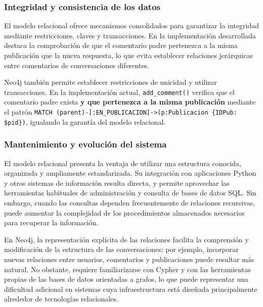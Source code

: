 \documentclass[11pt, a4paper]{article}
\begin{document}
\subsubsection{Integridad y consistencia de los datos}
El modelo relacional ofrece mecanismos consolidados para garantizar la integridad mediante restricciones, claves y transacciones. En la implementación desarrollada destaca la comprobación de que el comentario padre pertenezca a la misma publicación que la nueva respuesta, lo que evita establecer relaciones jerárquicas entre comentarios de conversaciones diferentes.

Neo4j también permite establecer restricciones de unicidad y utilizar transacciones. En la implementación actual, \texttt{add\_comment()} verifica que el comentario padre exista \textbf{y que pertenezca a la misma publicación} mediante el patrón \texttt{MATCH (parent)-[:EN\_PUBLICACION]->(p:Publicacion \{IDPub: \$pid\})}, igualando la garantía del modelo relacional.

\subsubsection{Mantenimiento y evolución del sistema}
El modelo relacional presenta la ventaja de utilizar una estructura conocida, organizada y ampliamente estandarizada. Su integración con aplicaciones Python y otros sistemas de información resulta directa, y permite aprovechar las herramientas habituales de administración y consulta de bases de datos SQL. Sin embargo, cuando las consultas dependen frecuentemente de relaciones recursivas, puede aumentar la complejidad de los procedimientos almacenados necesarios para recuperar la información.

En Neo4j, la representación explícita de las relaciones facilita la comprensión y modificación de la estructura de las conversaciones; por ejemplo, incorporar nuevas relaciones entre usuarios, comentarios y publicaciones puede resultar más natural. No obstante, requiere familiarizarse con Cypher y con las herramientas propias de las bases de datos orientadas a grafos, lo que puede representar una dificultad adicional en sistemas cuya infraestructura está diseñada principalmente alrededor de tecnologías relacionales.
\end{document}
